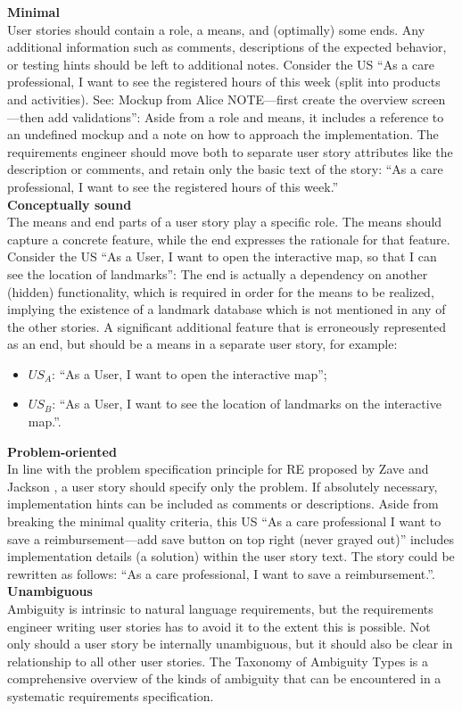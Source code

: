 \textbf{Minimal}\\ 
User stories should contain a role, a means, and (optimally) some ends. Any additional information such as comments, descriptions of the expected behavior, or testing hints should be left to additional notes. Consider the US \enquote{As a care professional, I want to see the registered hours of this week (split into products and activities). See: Mockup from Alice NOTE—first create the overview screen—then add validations}: Aside from a role and means, it includes a reference to an undefined mockup and a note on how to approach the implementation. The requirements engineer should move both to separate user story attributes like the description or comments, and retain only the basic text of the story: \enquote{As a care professional, I want to see the registered hours of this week.} \\ 
\textbf{Conceptually sound}\\ 
The means and end parts of a user story play a specific role. The means should capture a concrete feature, while the end expresses the rationale for that feature. Consider the US \enquote{As a User, I want to open the interactive map, so that I can see the location of landmarks}: The end is actually a dependency on another (hidden) functionality, which is required in order for the means to be realized, implying the existence of a landmark database which is not mentioned in any of the other stories. A signiﬁcant additional feature that is erroneously represented as an end, but should be a means in a separate user story, for example:
\begin{itemize}
\item $US_A$: \enquote{As a User, I want to open the interactive map};
\item $US_B$: \enquote{As a User, I want to see the location of landmarks on the interactive map.}.
\end{itemize}
\textbf{Problem-oriented}\\ 
In line with the problem specification principle for RE proposed by Zave and Jackson \cite{zave1997four}, a user story should specify only the problem. If absolutely necessary, implementation hints can be included as comments or descriptions. Aside from breaking the minimal quality criteria, this US \enquote{As a care professional I want to save a reimbursement—add save button on top right (never grayed out)} includes implementation details (a solution) within the user story text. The story could be rewritten as follows: \enquote{As a care professional, I want to save a reimbursement.}. \\ 
\textbf{Unambiguous}\\ 
Ambiguity is intrinsic to natural language requirements, but the requirements engineer writing user stories has to avoid it to the extent this is possible. Not only should a user story be internally unambiguous, but it should also be clear in relationship to all other user stories. The Taxonomy of Ambiguity Types \cite{berry2004ambiguity} is a comprehensive overview of the kinds of ambiguity that can be encountered in a systematic requirements specification.

